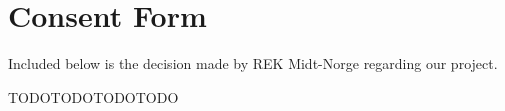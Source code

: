 \chapter{Consent Form}
\label{app:consentform}

Included below is the decision made by REK Midt-Norge regarding our project.

TODOTODOTODOTODO